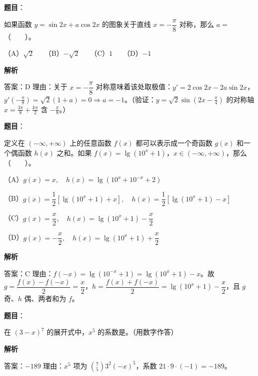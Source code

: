 \begin{answer}

\textbf{题目}：

如果函数 $y=\sin2x+a\cos2x$ 的图象关于直线 $x=-\dfrac\pi8$ 对称，那么 $a=$\mbox{（　　）}。

（A）$\sqrt2$　　（B）$-\sqrt2$　　（C）$1$　　（D）$-1$

\textbf{解析}

答案：D
理由：关于 $x=-\dfrac\pi8$ 对称意味着该处取极值：$y'=2\cos2x-2a\sin2x$，$y'\!\left(-\frac\pi8\right)=\sqrt2(1+a)=0\Rightarrow a=-1$。（验证：$y=\sqrt2\sin\left(2x-\frac\pi4\right)$ 的对称轴 $x=\frac{3\pi}{8}+\frac{k\pi}{2}$ 含 $-\frac\pi8$。）


\end{answer}
\begin{answer}

\textbf{题目}：

定义在 $(-\infty,+\infty)$ 上的任意函数 $f(x)$ 都可以表示成一个奇函数 $g(x)$ 和一个偶函数 $h(x)$ 之和。如果 $f(x)=\lg(10^x+1)$，$x\in(-\infty,+\infty)$，那么\mbox{（　　）}。

（A）$g(x)=x,\quad h(x)=\lg(10^x+10^{-x}+2)$

（B）$g(x)=\dfrac12[\lg(10^x+1)+x],\quad h(x)=\dfrac12[\lg(10^x+1)-x]$

（C）$g(x)=\dfrac{x}{2},\quad h(x)=\lg(10^x+1)-\dfrac{x}{2}$

（D）$g(x)=-\dfrac{x}{2},\quad h(x)=\lg(10^x+1)+\dfrac{x}{2}$

\textbf{解析}

答案：C
理由：$f(-x)=\lg(10^{-x}+1)=\lg(10^x+1)-x$。故 $g=\dfrac{f(x)-f(-x)}2=\dfrac x2$，$h=\dfrac{f(x)+f(-x)}2=\lg(10^x+1)-\dfrac x2$，且 $g$ 奇、$h$ 偶、两者和为 $f$。


\end{answer}
\begin{answer}

\textbf{题目}：

在 $(3-x)^7$ 的展开式中，$x^5$ 的系数是\underline{\qquad\qquad}。（用数字作答）

\textbf{解析}

答案：$-189$
理由：$x^5$ 项为 $\binom75 3^2(-x)^5$，系数 $21\cdot9\cdot(-1)=-189$。


\end{answer}

